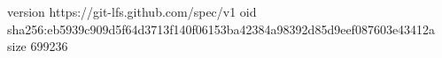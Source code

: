 version https://git-lfs.github.com/spec/v1
oid sha256:eb5939c909d5f64d3713f140f06153ba42384a98392d85d9eef087603e43412a
size 699236
